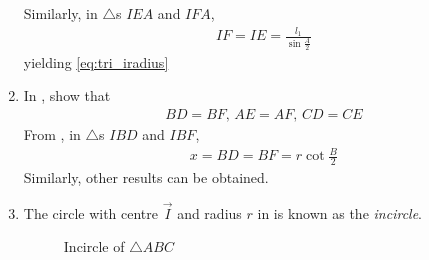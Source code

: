\begin{enumerate}[label=\thesection.\arabic*.,ref=\thesection.\theenumi]
		Similarly, 
in $\triangle$s $IEA$ and $IFA$, 
		\begin{align}
IF = IE=  \frac{l_1}{\sin\frac{A}{2}}
		\end{align}
		yielding 
	\eqref{eq:tri_iradius}	
  \item In
	, show that
  \begin{align}
	  BD=BF ,\, 
	  AE=AF ,\, 
	  CD=CE 
  \end{align}
  \solution  From 
, in $\triangle$s $IBD$ and $IBF$, 
		\begin{align}
			x = BD = BF = r \cot \frac{B}{2}
		\end{align}
		Similarly, other results can be obtained.
\item The circle with centre $\vec{I}$ and radius $r$ in  
is known as the {\em incircle}. 
\begin{figure}[!ht]
	\begin{center}
		\resizebox{\columnwidth}{!}{}
	\end{center}
	\caption{Incircle of $\triangle ABC$}
	\label{fig:tri_icircle}	
\end{figure}
\iffalse
\\
\solution
In $\triangle IBC$, 
		\begin{align}
			a = x + y = r\cot \frac{B}{2}+ r\cot \frac{C}{2}
			\\
			\implies r = \frac{a}{\cot \frac{B}{2}+ \cot \frac{C}{2}}
		\end{align}
		\fi
\end{enumerate}

